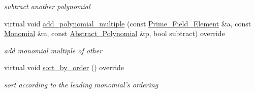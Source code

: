 \begin{Indent}
\begin{DoxyCompactItemize}
\begin{DoxyCompactList}\small\item\em subtract another polynomial \end{DoxyCompactList}\item 
\mbox{\label{group__polygroup_a4536176cfe316974e14d3273ac9f9462}} 
virtual void \hyperlink{group__polygroup_a4536176cfe316974e14d3273ac9f9462}{add\+\_\+polynomial\+\_\+multiple} (const \hyperlink{group___fields_group_class_prime___field___element}{Prime\+\_\+\+Field\+\_\+\+Element} \&a, const \hyperlink{group__polygroup_class_monomial}{Monomial} \&u, const \hyperlink{group__polygroup_class_abstract___polynomial}{Abstract\+\_\+\+Polynomial} \&p, bool subtract) override
\begin{DoxyCompactList}\small\item\em add monomial multiple of other \end{DoxyCompactList}\item 
virtual void \hyperlink{group__polygroup_a41e751eee1614e26ebba39a9f81f7993}{sort\+\_\+by\+\_\+order} () override
\begin{DoxyCompactList}\small\item\em sort according to the leading monomial's ordering \end{DoxyCompactList}\end{DoxyCompactItemize}
\end{Indent}
